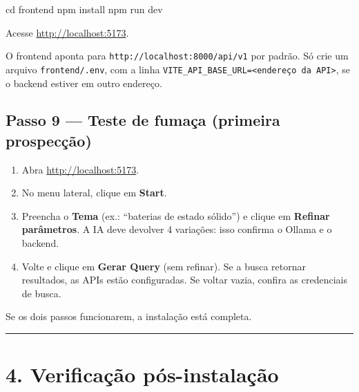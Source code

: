 \documentclass[
  brazilian,
  a4paper,12pt,oneside]{report}
\newenvironment{Shaded}{}{}
\newcommand{\FunctionTok}[1]{\textcolor[rgb]{0.02,0.16,0.49}{#1}}
\newcommand{\NormalTok}[1]{#1}
\providecommand{\tightlist}{%
  \setlength{\itemsep}{0pt}\setlength{\parskip}{0pt}}
\begin{document}
\begin{Shaded}
\begin{Highlighting}[]
\FunctionTok{cd}\NormalTok{ frontend}
\NormalTok{npm install}
\NormalTok{npm run dev}
\end{Highlighting}
\end{Shaded}

Acesse \url{http://localhost:5173}.

O frontend aponta para
\texttt{http:}\allowbreak{}\texttt{/}\allowbreak{}\texttt{/}\allowbreak{}\texttt{localhost:}\allowbreak{}\texttt{8000/}\allowbreak{}\texttt{api/}\allowbreak{}\texttt{v1}
por padrão. Só crie um arquivo
\texttt{frontend/}\allowbreak{}\texttt{.}\allowbreak{}\texttt{env}, com
a linha
\texttt{VITE\_}\allowbreak{}\texttt{API\_}\allowbreak{}\texttt{BASE\_}\allowbreak{}\texttt{URL=}\allowbreak{}\texttt{\textless{}endereço\ da\ API\textgreater{}},
se o backend estiver em outro endereço.

\section{Passo 9 --- Teste de fumaça (primeira
prospecção)}\label{passo-9-teste-de-fumauxe7a-primeira-prospecuxe7uxe3o}

\begin{enumerate}
\def\labelenumi{\arabic{enumi}.}
\tightlist
\item
  Abra \url{http://localhost:5173}.
\item
  No menu lateral, clique em \textbf{Start}.
\item
  Preencha o \textbf{Tema} (ex.: ``baterias de estado sólido'') e clique
  em \textbf{Refinar parâmetros}. A IA deve devolver 4 variações: isso
  confirma o Ollama e o backend.
\item
  Volte e clique em \textbf{Gerar Query} (sem refinar). Se a busca
  retornar resultados, as APIs estão configuradas. Se voltar vazia,
  confira as credenciais de busca.
\end{enumerate}

Se os dois passos funcionarem, a instalação está completa.

\begin{center}\rule{0.5\linewidth}{0.5pt}\end{center}

\chapter{4. Verificação
pós-instalação}\label{verificauxe7uxe3o-puxf3s-instalauxe7uxe3o}
\end{document}
